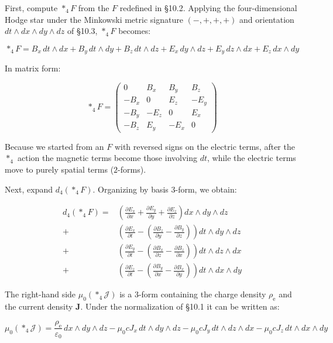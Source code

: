 \documentclass[a4paper,12pt,openany]{book}
\begin{document}
First, compute \(\ast_4F\) from the \(F\) redefined in §10.2. Applying
the four-dimensional Hodge star under the Minkowski metric signature
\((-,+,+,+)\) and orientation \(dt\wedge dx\wedge dy\wedge dz\) of
§10.3, \(\ast_4F\) becomes:

\[
\ast_4F = B_x\,dt\wedge dx + B_y\,dt\wedge dy + B_z\,dt\wedge dz + E_x\,dy\wedge dz + E_y\,dz\wedge dx + E_z\,dx\wedge dy
\]

In matrix form:

\[\ast_4F = \begin{pmatrix}
0 & B_x & B_y & B_z \\
-B_x & 0 & E_z & -E_y \\
-B_y & -E_z & 0 & E_x \\
-B_z & E_y & -E_x & 0
\end{pmatrix}\]

Because we started from an \(F\) with reversed signs on the electric
terms, after the \(\ast_4\) action the magnetic terms become those
involving \(dt\), while the electric terms move to purely spatial terms
(\(2\)-forms).

Next, expand \(d_4(\ast_4F)\). Organizing by basis \(3\)-form, we
obtain:

\[\begin{aligned}
d_4(\ast_4F) = &\left(\frac{\partial E_x}{\partial x} + \frac{\partial E_y}{\partial y} + \frac{\partial E_z}{\partial z}\right) dx\wedge dy\wedge dz \\
{+} &\left(\frac{\partial E_x}{\partial t} - \left(\frac{\partial B_z}{\partial y} - \frac{\partial B_y}{\partial z}\right)\right) dt\wedge dy\wedge dz \\
{+} &\left(\frac{\partial E_y}{\partial t} - \left(\frac{\partial B_x}{\partial z} - \frac{\partial B_z}{\partial x}\right)\right) dt\wedge dz\wedge dx \\
{+} &\left(\frac{\partial E_z}{\partial t} - \left(\frac{\partial B_y}{\partial x} - \frac{\partial B_x}{\partial y}\right)\right) dt\wedge dx\wedge dy
\end{aligned}\]

The right-hand side \(\mu_0(\ast_4\mathcal{J})\) is a \(3\)-form
containing the charge density \(\rho_{\mathrm e}\) and the current
density \(\mathbf{J}\). Under the normalization of §10.1 it can be
written as:

\[
\mu_0(\ast_4\mathcal{J}) = \frac{\rho_{\mathrm e}}{\varepsilon_0}\,dx\wedge dy\wedge dz - \mu_0 c J_x\,dt\wedge dy\wedge dz - \mu_0 c J_y\,dt\wedge dz\wedge dx - \mu_0 c J_z\,dt\wedge dx\wedge dy
\]
\end{document}
